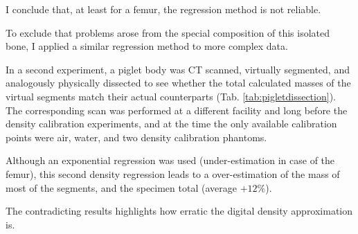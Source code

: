 I conclude that, at least for a femur, the regression method is not reliable.

\bigskip
To exclude that problems arose from the special composition of this isolated bone, I applied a similar regression method to more complex data.

In a second experiment, a piglet body was CT scanned, virtually segmented, and analogously physically dissected to see whether the total calculated masses of the virtual segments match their actual counterparts (Tab. \ref{tab:pigletdissection}).
The corresponding scan was performed at a different facility and long before the density calibration experiments, and at the time the only available calibration points were air, water, and two density calibration phantoms.

Although an exponential regression was used (under-estimation in case of the femur), this second density regression leads to a over-estimation of the mass of most of the segments, and the specimen total (average \(+12 \%\)).

The contradicting results highlights how erratic the digital density approximation is.



